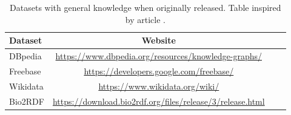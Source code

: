 \begin{table}[h]
\centering
\label{tab:knowledge_datasets}
\begin{tabular}{lccc}
\toprule
Dataset & Website \\
\midrule
DBpedia     & \url{https://www.dbpedia.org/resources/knowledge-graphs/} \\
Freebase    & \url{https://developers.google.com/freebase/} \\
Wikidata    & \url{https://www.wikidata.org/wiki/} \\
Bio2RDF     & \url{https://download.bio2rdf.org/files/release/3/release.html} \\
\bottomrule
\end{tabular}
\caption{Datasets with general knowledge when originally released. Table inspired by article \parencite{ji2021survey}.}
\end{table}